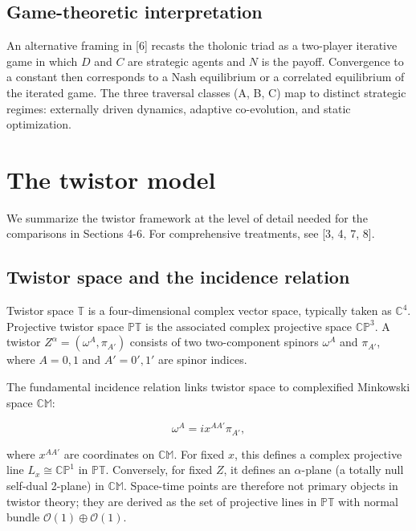 \documentclass[12pt]{article}
\begin{document}
\subsection{Game-theoretic interpretation}\label{game-theoretic-interpretation}

An alternative framing in {[}6{]} recasts the tholonic triad as a
two-player iterative game in which \(D\) and \(C\) are strategic agents
and \(N\) is the payoff. Convergence to a constant then corresponds to a
Nash equilibrium or a correlated equilibrium of the iterated game. The
three traversal classes (A, B, C) map to distinct strategic regimes:
externally driven dynamics, adaptive co-evolution, and static
optimization.

\section{The twistor model}\label{the-twistor-model}

We summarize the twistor framework at the level of detail needed for the
comparisons in Sections 4-6. For comprehensive treatments, see {[}3, 4,
7, 8{]}.

\subsection{Twistor space and the incidence relation}\label{twistor-space-and-the-incidence-relation}

Twistor space \(\mathbb{T}\) is a four-dimensional complex vector space,
typically taken as \(\mathbb{C}^4\). Projective twistor space
\(\mathbb{PT}\) is the associated complex projective space
\(\mathbb{CP}^3\). A twistor \(Z^\alpha = (\omega^A, \pi_{A'})\)
consists of two two-component spinors \(\omega^A\) and \(\pi_{A'}\),
where \(A = 0, 1\) and \(A' = 0', 1'\) are spinor indices.

The fundamental incidence relation links twistor space to complexified
Minkowski space \(\mathbb{CM}\):

\[
\omega^A = i x^{AA'} \pi_{A'},
\]

where \(x^{AA'}\) are coordinates on \(\mathbb{CM}\). For fixed \(x\),
this defines a complex projective line \(L_x \cong \mathbb{CP}^1\) in
\(\mathbb{PT}\). Conversely, for fixed \(Z\), it defines an
\(\alpha\)-plane (a totally null self-dual 2-plane) in \(\mathbb{CM}\).
Space-time points are therefore not primary objects in twistor theory;
they are derived as the set of projective lines in \(\mathbb{PT}\) with
normal bundle \(\mathcal{O}(1) \oplus \mathcal{O}(1)\).
\end{document}
